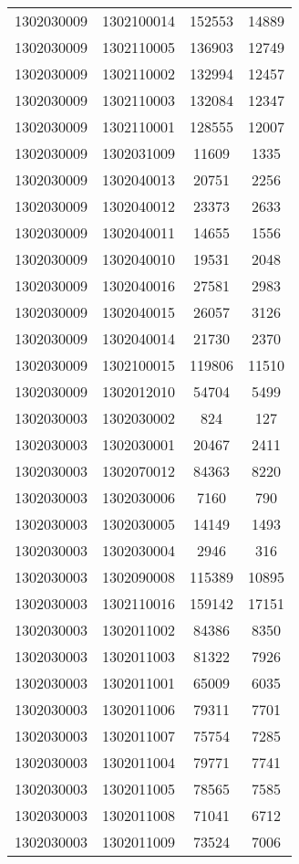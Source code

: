\begin{longtable}[h]{llcc}
		1302030009 & 1302100014 & 152553 & 14889\\
		1302030009 & 1302110005 & 136903 & 12749\\
		1302030009 & 1302110002 & 132994 & 12457\\
		1302030009 & 1302110003 & 132084 & 12347\\
		1302030009 & 1302110001 & 128555 & 12007\\
		1302030009 & 1302031009 & 11609 & 1335\\
		1302030009 & 1302040013 & 20751 & 2256\\
		1302030009 & 1302040012 & 23373 & 2633\\
		1302030009 & 1302040011 & 14655 & 1556\\
		1302030009 & 1302040010 & 19531 & 2048\\
		1302030009 & 1302040016 & 27581 & 2983\\
		1302030009 & 1302040015 & 26057 & 3126\\
		1302030009 & 1302040014 & 21730 & 2370\\
		1302030009 & 1302100015 & 119806 & 11510\\
		1302030009 & 1302012010 & 54704 & 5499\\
		1302030003 & 1302030002 & 824 & 127\\
		1302030003 & 1302030001 & 20467 & 2411\\
		1302030003 & 1302070012 & 84363 & 8220\\
		1302030003 & 1302030006 & 7160 & 790\\
		1302030003 & 1302030005 & 14149 & 1493\\
		1302030003 & 1302030004 & 2946 & 316\\
		1302030003 & 1302090008 & 115389 & 10895\\
		1302030003 & 1302110016 & 159142 & 17151\\
		1302030003 & 1302011002 & 84386 & 8350\\
		1302030003 & 1302011003 & 81322 & 7926\\
		1302030003 & 1302011001 & 65009 & 6035\\
		1302030003 & 1302011006 & 79311 & 7701\\
		1302030003 & 1302011007 & 75754 & 7285\\
		1302030003 & 1302011004 & 79771 & 7741\\
		1302030003 & 1302011005 & 78565 & 7585\\
		1302030003 & 1302011008 & 71041 & 6712\\
		1302030003 & 1302011009 & 73524 & 7006\\

\end{longtable}
